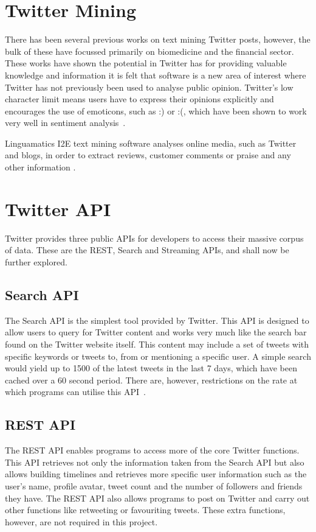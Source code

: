\section{Twitter Mining}
There has been several previous works on text mining Twitter posts, however, the bulk of these have focussed primarily on biomedicine and the financial sector. These works have shown the potential in Twitter has for providing valuable knowledge and information it is felt that software is a new area of interest where Twitter has not previously been used to analyse public opinion. Twitter's low character limit means users have to express their opinions explicitly and encourages the use of emoticons, such as :) or :(, which have been shown to work very well in sentiment analysis~\cite{Read:2005}.


Linguamatics I2E text mining software analyses online media, such as Twitter and blogs, in order to extract reviews, customer comments or praise and any other information \cite{linguamatics}.

\section{Twitter API}
Twitter provides three public APIs for developers to access their massive corpus of data. These are the REST, Search and Streaming APIs, and shall now be further explored.

\subsection{Search API}
The Search API is the simplest tool provided by Twitter. This API is designed to allow users to query for Twitter content and works very much like the search bar found on the Twitter website itself. This content may include a set of tweets with specific keywords or tweets to, from or mentioning a specific user. A simple search would yield up to 1500 of the latest tweets in the last 7 days, which have been cached over a 60 second period. There are, however, restrictions on the rate at which programs can utilise this API~\cite{twitter}.

\subsection{REST API}
The REST API enables programs to access more of the core Twitter functions. This API retrieves not only the information taken from the Search API but also allows building timelines and retrieves more specific user information such as the user's name, profile avatar, tweet count and the number of followers and friends they have. The REST API also allows programs to post on Twitter and carry out other functions like retweeting or favouriting tweets. These extra functions, however, are not required in this project.

